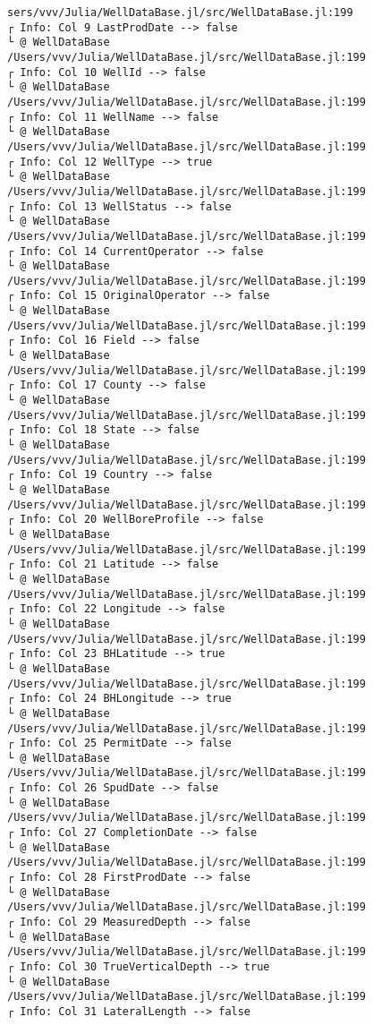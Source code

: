 \documentclass[11pt]{article}
\begin{document}
    \begin{Verbatim}[commandchars=\\\{\}]
sers/vvv/Julia/WellDataBase.jl/src/WellDataBase.jl:199
┌ Info: Col 9 LastProdDate --> false
└ @ WellDataBase /Users/vvv/Julia/WellDataBase.jl/src/WellDataBase.jl:199
┌ Info: Col 10 WellId --> false
└ @ WellDataBase /Users/vvv/Julia/WellDataBase.jl/src/WellDataBase.jl:199
┌ Info: Col 11 WellName --> false
└ @ WellDataBase /Users/vvv/Julia/WellDataBase.jl/src/WellDataBase.jl:199
┌ Info: Col 12 WellType --> true
└ @ WellDataBase /Users/vvv/Julia/WellDataBase.jl/src/WellDataBase.jl:199
┌ Info: Col 13 WellStatus --> false
└ @ WellDataBase /Users/vvv/Julia/WellDataBase.jl/src/WellDataBase.jl:199
┌ Info: Col 14 CurrentOperator --> false
└ @ WellDataBase /Users/vvv/Julia/WellDataBase.jl/src/WellDataBase.jl:199
┌ Info: Col 15 OriginalOperator --> false
└ @ WellDataBase /Users/vvv/Julia/WellDataBase.jl/src/WellDataBase.jl:199
┌ Info: Col 16 Field --> false
└ @ WellDataBase /Users/vvv/Julia/WellDataBase.jl/src/WellDataBase.jl:199
┌ Info: Col 17 County --> false
└ @ WellDataBase /Users/vvv/Julia/WellDataBase.jl/src/WellDataBase.jl:199
┌ Info: Col 18 State --> false
└ @ WellDataBase /Users/vvv/Julia/WellDataBase.jl/src/WellDataBase.jl:199
┌ Info: Col 19 Country --> false
└ @ WellDataBase /Users/vvv/Julia/WellDataBase.jl/src/WellDataBase.jl:199
┌ Info: Col 20 WellBoreProfile --> false
└ @ WellDataBase /Users/vvv/Julia/WellDataBase.jl/src/WellDataBase.jl:199
┌ Info: Col 21 Latitude --> false
└ @ WellDataBase /Users/vvv/Julia/WellDataBase.jl/src/WellDataBase.jl:199
┌ Info: Col 22 Longitude --> false
└ @ WellDataBase /Users/vvv/Julia/WellDataBase.jl/src/WellDataBase.jl:199
┌ Info: Col 23 BHLatitude --> true
└ @ WellDataBase /Users/vvv/Julia/WellDataBase.jl/src/WellDataBase.jl:199
┌ Info: Col 24 BHLongitude --> true
└ @ WellDataBase /Users/vvv/Julia/WellDataBase.jl/src/WellDataBase.jl:199
┌ Info: Col 25 PermitDate --> false
└ @ WellDataBase /Users/vvv/Julia/WellDataBase.jl/src/WellDataBase.jl:199
┌ Info: Col 26 SpudDate --> false
└ @ WellDataBase /Users/vvv/Julia/WellDataBase.jl/src/WellDataBase.jl:199
┌ Info: Col 27 CompletionDate --> false
└ @ WellDataBase /Users/vvv/Julia/WellDataBase.jl/src/WellDataBase.jl:199
┌ Info: Col 28 FirstProdDate --> false
└ @ WellDataBase /Users/vvv/Julia/WellDataBase.jl/src/WellDataBase.jl:199
┌ Info: Col 29 MeasuredDepth --> false
└ @ WellDataBase /Users/vvv/Julia/WellDataBase.jl/src/WellDataBase.jl:199
┌ Info: Col 30 TrueVerticalDepth --> true
└ @ WellDataBase /Users/vvv/Julia/WellDataBase.jl/src/WellDataBase.jl:199
┌ Info: Col 31 LateralLength --> false

\end{Verbatim}
\end{document}
